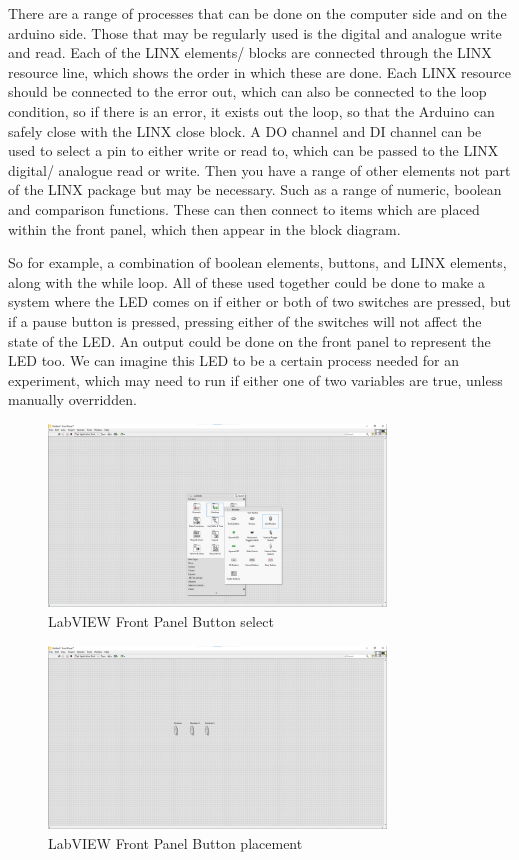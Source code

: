 \documentclass[a4paper,11pt]{report}
\begin{document}
There are a range of processes that can be done on the computer side and on the arduino side. Those that may be regularly used is the digital and analogue write and read. Each of the LINX elements/ blocks are connected through the LINX resource line, which shows the order in which these are done. Each LINX resource should be connected to the error out, which can also be connected to the loop condition, so if there is an error, it exists out the loop, so that the Arduino can safely close with the LINX close block. A DO channel and DI channel can be used to select a pin to either write or read to, which can be passed to the LINX digital/ analogue read or write. Then you have a range of other elements not part of the LINX package but may be necessary. Such as a range of numeric, boolean and comparison functions. These can then connect to items which are placed within the front panel, which then appear in the block diagram.

So for example, a combination of boolean elements, buttons, and LINX elements, along with the while loop. All of these used together could be done to make a system where the LED comes on if either or both of two switches are pressed, but if a pause button is pressed, pressing either of the switches will not affect the state of the LED. An output could be done on the front panel to represent the LED too. We can imagine this LED to be a certain process needed for an experiment, which may need to run if either one of two variables are true, unless manually overridden.

\begin{figure}[H]
\centering
\includegraphics[width=0.8\textwidth]{screenshots/labview10}
\caption{LabVIEW Front Panel Button select}
\end{figure}

\begin{figure}[H]
\centering
\includegraphics[width=0.8\textwidth]{screenshots/labview11}
\caption{LabVIEW Front Panel Button placement}
\end{figure}
\end{document}
